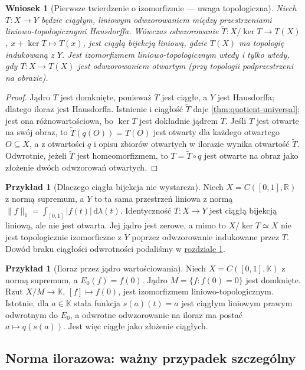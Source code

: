 \documentclass[11pt,a4paper]{article}
\numberwithin{equation}{section}
\theoremstyle{plain}
\newtheorem{wniosek}[twierdzenie]{Wniosek}
\theoremstyle{definition}
\newtheorem{przyklad}[twierdzenie]{Przykład}
\theoremstyle{remark}
\newcommand{\R}{\mathbb R}
\newcommand{\K}{\mathbb K}
\begin{document}
\begin{wniosek}[Pierwsze twierdzenie o izomorfizmie --- uwaga topologiczna]
Niech $T:X\to Y$ będzie ciągłym, liniowym odwzorowaniem
między przestrzeniami liniowo-topologicznymi Hausdorffa.
Wówczas odwzorowanie
$\widetilde T:X/\ker T\to T(X)$, $x+\ker T\mapsto T(x)$,
jest ciągłą bijekcją liniową, gdzie $T(X)$ ma topologię
indukowaną z $Y$. Jest izomorfizmem liniowo-topologicznym
wtedy i tylko wtedy, gdy $T:X\to T(X)$ jest odwzorowaniem
otwartym (przy topologii podprzestrzeni na obrazie).
\end{wniosek}
\begin{proof}
Jądro $T$ jest domknięte, ponieważ $T$ jest ciągłe,
a $Y$ jest Hausdorffa; dlatego iloraz jest Hausdorffa.
Istnienie i ciągłość $\widetilde T$ daje
\ref{thm:quotient-universal}; jest ona różnowartościowa,
bo $\ker T$ jest dokładnie jądrem $T$.
Jeśli $T$ jest otwarte na swój obraz, to
$\widetilde T(q(O))=T(O)$ jest otwarty dla każdego otwartego
$O\subseteq X$, a z otwartości $q$ i opisu zbiorów
otwartych w ilorazie wynika otwartość $\widetilde T$.
Odwrotnie, jeżeli $\widetilde T$ jest homeomorfizmem,
to $T=\widetilde T\circ q$ jest otwarte na obraz jako
złożenie dwóch odwzorowań otwartych.
\end{proof}

\begin{przyklad}[Dlaczego ciągła bijekcja nie wystarcza]
Niech $X=C([0,1],\R)$ z normą supremum, a $Y$ to ta sama
przestrzeń liniowa z normą $\|f\|_1=\int_{[0,1]}|f(t)|\,\mathrm d\lambda(t)$.
Identyczność $T:X\to Y$ jest ciągłą bijekcją liniową,
ale nie jest otwarta. Jej jądro jest zerowe, a mimo to
$X/\ker T\simeq X$ nie jest topologicznie izomorficzne z $Y$
poprzez odwzorowanie indukowane przez $T$. Dowód braku
ciągłości odwrotności podaliśmy w \hyperref[sec:tvs]{rozdziale 1}.
\end{przyklad}

\begin{przyklad}[Iloraz przez jądro wartościowania]
Niech $X=C([0,1],\K)$ z normą supremum, a
$E_0(f)=f(0)$. Jądro $M=\{f:f(0)=0\}$ jest domknięte.
Rzut $X/M\to\K$, $[f]\mapsto f(0)$, jest izomorfizmem
liniowo-topologicznym. Istotnie, dla $a\in\K$ stała
funkcja $s(a)(t)=a$ jest ciągłym liniowym prawym odwrotnym
do $E_0$, a odwrotne odwzorowanie na iloraz ma postać
$a\mapsto q(s(a))$. Jest więc ciągłe jako złożenie ciągłych.
\end{przyklad}

\subsection{Norma ilorazowa: ważny przypadek szczególny}
\end{document}
